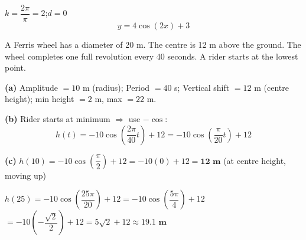 \documentclass[addpoints]{exam}
\begin{document}
\begin{questions}
\begin{solution}[8cm]
$k = \dfrac{2\pi}{\pi} = 2$;\quad $d = 0$
\[
y = 4\cos(2x) + 3
\]
\end{solution}

\question A Ferris wheel has a diameter of 20 m. The centre is 12 m above the ground.
The wheel completes one full revolution every 40 seconds. A rider starts at the
lowest point.
\begin{solution}[9cm]
\textbf{(a)} Amplitude $= 10$ m (radius); Period $= 40$ s;
Vertical shift $= 12$ m (centre height); min height $= 2$ m, max $= 22$ m.

\textbf{(b)} Rider starts at minimum $\Rightarrow$ use $-\cos$:
\[
h(t) = -10\cos\!\left(\frac{2\pi}{40}t\right) + 12 = -10\cos\!\left(\frac{\pi}{20}t\right) + 12
\]

\textbf{(c)} $h(10) = -10\cos\!\left(\dfrac{\pi}{2}\right) + 12 = -10(0) + 12 = \mathbf{12 \text{ m}}$
(at centre height, moving up)

$h(25) = -10\cos\!\left(\dfrac{25\pi}{20}\right) + 12 = -10\cos\!\left(\dfrac{5\pi}{4}\right) + 12$
$= -10\!\left(-\dfrac{\sqrt{2}}{2}\right) + 12 = 5\sqrt{2} + 12 \approx \mathbf{19.1 \text{ m}}$
\end{solution}

\end{questions}
\end{document}
